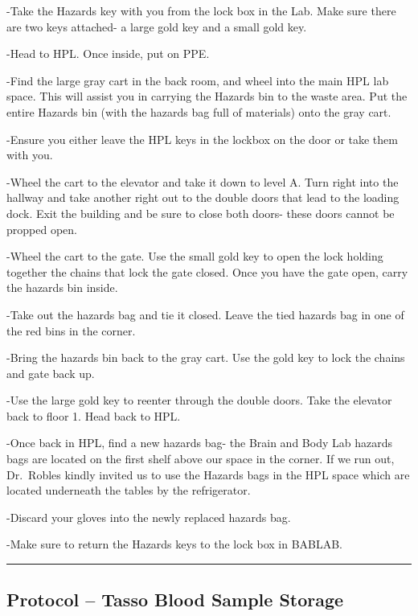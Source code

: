 \documentclass[]{book}
\begin{document}
-Take the Hazards key with you from the lock box in the Lab. Make sure there are two keys attached- a large gold key and a small gold key.

-Head to HPL. Once inside, put on PPE.

-Find the large gray cart in the back room, and wheel into the main HPL lab space. This will assist you in carrying the Hazards bin to the waste area. Put the entire Hazards bin (with the hazards bag full of materials) onto the gray cart.

-Ensure you either leave the HPL keys in the lockbox on the door or take them with you.

-Wheel the cart to the elevator and take it down to level A. Turn right into the hallway and take another right out to the double doors that lead to the loading dock. Exit the building and be sure to close both doors- these doors cannot be propped open.

-Wheel the cart to the gate. Use the small gold key to open the lock holding together the chains that lock the gate closed. Once you have the gate open, carry the hazards bin inside.

-Take out the hazards bag and tie it closed. Leave the tied hazards bag in one of the red bins in the corner.

-Bring the hazards bin back to the gray cart. Use the gold key to lock the chains and gate back up.

-Use the large gold key to reenter through the double doors. Take the elevator back to floor 1. Head back to HPL.

-Once back in HPL, find a new hazards bag- the Brain and Body Lab hazards bags are located on the first shelf above our space in the corner. If we run out, Dr.~Robles kindly invited us to use the Hazards bags in the HPL space which are located underneath the tables by the refrigerator.

-Discard your gloves into the newly replaced hazards bag.

-Make sure to return the Hazards keys to the lock box in BABLAB.

\begin{center}\rule{0.5\linewidth}{0.5pt}\end{center}

\hypertarget{protocol-tasso-blood-sample-storage-1}{%
\subsection{Protocol -- Tasso Blood Sample Storage}\label{protocol-tasso-blood-sample-storage-1}}
\end{document}
